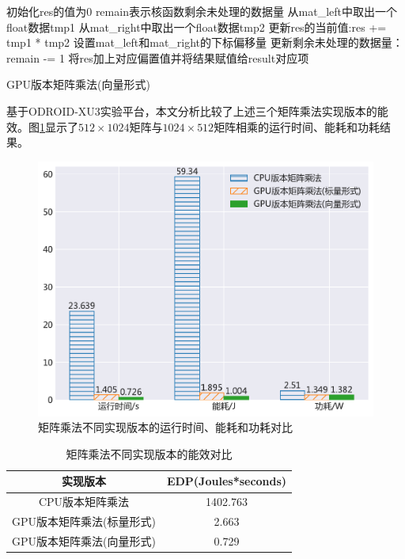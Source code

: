 \begin{algorithm}[htbp]
  \small
  \SetAlgoLined
    \begin{spacing}{0.9}
    初始化res的值为0\;
    remain表示核函数剩余未处理的数据量\;
     {
        从mat\_left中取出一个float数据tmp1\;
        从mat\_right中取出一个float数据tmp2\;
        更新res的当前值:res += tmp1 * tmp2\;
        设置mat\_left和mat\_right的下标偏移量\;
        更新剩余未处理的数据量：remain -= 1\;
    }
    将res加上对应偏置值并将结果赋值给result对应项\;
    \end{spacing}
  \caption{GPU版本矩阵乘法(向量形式)}
  \label{algo:algorithm3}
\end{algorithm}

基于ODROID-XU3实验平台，本文分析比较了上述三个矩阵乘法实现版本的能效。图\ref{figure:figure9}显示了$512\times1024$矩阵与$1024\times512$矩阵相乘的运行时间、能耗和功耗结果。

\begin{figure}[htbp]
    \begin{center}
    \includegraphics[height=0.4\textwidth]{figures/matmul.pdf}
    \end{center}
    \caption{矩阵乘法不同实现版本的运行时间、能耗和功耗对比}\label{figure:figure9}
\end{figure}

\begin{table}[htbp]
  \centering
  \caption{矩阵乘法不同实现版本的能效对比}
  \label{table:table1}
  \begin{tabular}{cc}
    \toprule
      实现版本 & EDP(Joules*seconds) \\
    \midrule
      CPU版本矩阵乘法 & 1402.763 \\
      GPU版本矩阵乘法(标量形式) & 2.663 \\
      GPU版本矩阵乘法(向量形式) & 0.729 \\
    \bottomrule
  \end{tabular}
\end{table}

